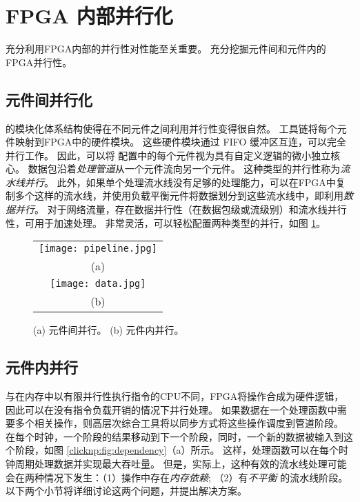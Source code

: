 \section{FPGA 内部并行化}
\label{clicknp:sec:optimization}

充分利用FPGA内部的并行性对性能至关重要。
\name 充分挖掘元件间和元件内的FPGA并行性。

\subsection{元件间并行化}
\name 的模块化体系结构使得在不同元件之间利用并行性变得很自然。
\name 工具链将每个元件映射到FPGA中的硬件模块。
这些硬件模块通过 FIFO 缓冲区互连，可以完全并行工作。 
因此，可以将 \name 配置中的每个元件视为具有自定义逻辑的微小独立核心。
数据包沿着\textit {处理管道}从一个元件流向另一个元件。
这种类型的并行性称为\textit {流水线并行}。
此外，如果单个处理流水线没有足够的处理能力，可以在FPGA中复制多个这样的流水线，并使用负载平衡元件将数据划分到这些流水线中，即利用\textit{数据并行}。
对于网络流量，存在数据并行性（在数据包级或流级别）和流水线并行性，可用于加速处理。
\name 非常灵活，可以轻松配置两种类型的并行，如图 \ref{clicknp:fig:element-para}。

\begin{figure}
\centering
\begin{tabular}{c}
\texttt{[image: pipeline.jpg]}\\
(a)\\
\texttt{[image: data.jpg]}\\
(b)\\
\end{tabular}
\caption{(a) 元件间并行。 (b) 元件内并行。}
\label{clicknp:fig:element-para}
\end{figure}

\subsection{元件内并行}
\label{clicknp:subsec:paral_in_elem}

与在内存中以有限并行性执行指令的CPU不同，FPGA将操作合成为硬件逻辑，因此可以在没有指令负载开销的情况下并行处理。
如果数据在一个处理函数中需要多个相关操作，则高层次综合工具将以同步方式将这些操作调度到管道阶段。
在每个时钟，一个阶段的结果移动到下一个阶段，同时，一个新的数据被输入到这个阶段，如图 \ref{clicknp:fig:dependency}（a）所示。
这样，处理函数可以在每个时钟周期处理数据并实现最大吞吐量。
但是，实际上，这种有效的流水线处理可能会在两种情况下发生：（1）操作中存在\textit {内存依赖}; （2）有\textit {不平衡} 的流水线阶段。
以下两个小节将详细讨论这两个问题，并提出解决方案。



